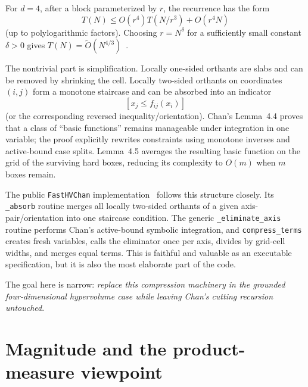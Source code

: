 \documentclass[12pt,a4paper]{article}
\theoremstyle{definition}
\newcommand{\1}{\mathbf 1}
\newcommand{\wtO}{\widetilde O}
\begin{document}
For $d=4$, after a block parameterized by $r$, the recurrence has the form
\begin{equation}
T(N)\le O(r^4)T(N/r^3)+O(r^4N)                         \label{eq:chanrec}
\end{equation}
(up to polylogarithmic factors). Choosing $r=N^\delta$ for a sufficiently small constant $\delta>0$ gives $T(N)=\wtO(N^{4/3})$~\cite{Chan2013}.

The nontrivial part is simplification. Locally one-sided orthants are slabs and can be removed by shrinking the cell. Locally two-sided orthants on coordinates $(i,j)$ form a monotone staircase and can be absorbed into an indicator
\[
[x_j\le f_{ij}(x_i)]
\]
(or the corresponding reversed inequality/orientation). Chan's Lemma~4.4 proves that a class of ``basic functions'' remains manageable under integration in one variable; the proof explicitly rewrites constraints using monotone inverses and active-bound case splits. Lemma~4.5 averages the resulting basic function on the grid of the surviving hard boxes, reducing its complexity to $O(m)$ when $m$ boxes remain.

The public \texttt{FastHVChan} implementation~\cite{FastHVChan} follows this structure closely. Its \texttt{\_absorb} routine merges all locally two-sided orthants of a given axis-pair/orientation into one staircase condition. The generic \texttt{\_eliminate\_axis} routine performs Chan's active-bound symbolic integration, and \texttt{compress\_terms} creates fresh variables, calls the eliminator once per axis, divides by grid-cell widths, and merges equal terms. This is faithful and valuable as an executable specification, but it is also the most elaborate part of the code.

The goal here is narrow: \emph{replace this compression machinery in the grounded four-dimensional hypervolume case while leaving Chan's cutting recursion untouched}.

\section{Magnitude and the product-measure viewpoint}
\end{document}
